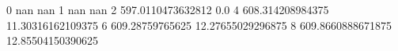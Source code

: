 0 nan nan
1 nan nan
2 597.0110473632812 0.0
4 608.314208984375 11.30316162109375
6 609.28759765625 12.27655029296875
8 609.8660888671875 12.85504150390625
